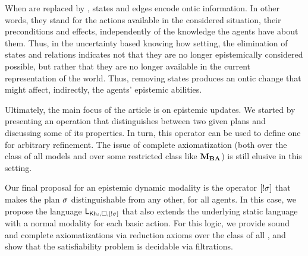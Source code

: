 \begin{mrevised}
When  are replaced by , states and edges encode ontic information. In other words, they stand for the actions available in the considered situation, their preconditions and effects, independently of the knowledge the agents have about them.  
%
%
Thus, in the uncertainty based knowing how setting, the elimination of states and relations indicates not that they are no longer epistemically considered possible, but rather that they are no longer available in the current representation of the world. 
Thus, removing states produces an ontic change that might affect,
indirectly, the agents’ epistemic abilities. 


Ultimately, the main focus of the article is on epistemic updates.  We started by presenting an operation that distinguishes between two given plans and discussing some of its properties. In turn, this operator can be used to define one for arbitrary refinement. The issue of complete axiomatization (both over the class of all models and over some restricted class like $\mathbf{M}_{\mathbf{BA}}$) is still elusive in this setting. 

Our final proposal for an epistemic dynamic modality is the operator $[!\sigma]$ that makes the plan $\sigma$ distinguishable from any other, for all agents. In this case, we propose the language $\mathsf{L}_{{\sf Kh}_i,\square,[!\sigma]}$ that also extends the underlying static language with a normal modality for each basic action. For this logic, we provide sound and complete axiomatizations via reduction axioms over the class of all , and show that the satisfiability problem is decidable via filtrations.  


\end{mrevised}
